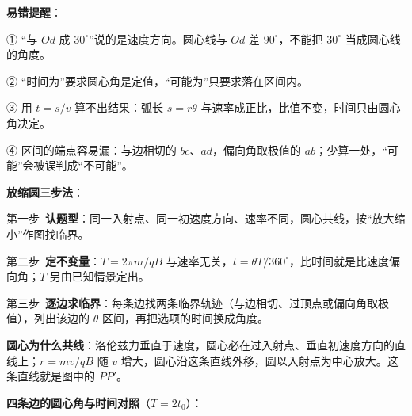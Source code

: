 \documentclass[\modimode]{modi-handout}
\begin{document}
\vspace*{10pt}
\begin{modistem}
\textbf{易错提醒}：

\par ① “与 $Od$ 成 $30^\circ$”说的是速度方向。圆心线与 $Od$ 差 $90^\circ$，不能把 $30^\circ$ 当成圆心线的角度。

\par ② “时间为”要求圆心角是定值，“可能为”只要求落在区间内。

\par ③ 用 $t=s/v$ 算不出结果：弧长 $s=r\theta$ 与速率成正比，比值不变，时间只由圆心角决定。

\par ④ 区间的端点容易漏：与边相切的 $bc$、$ad$，偏向角取极值的 $ab$；少算一处，“可能”会被误判成“不可能”。
\end{modistem}

\newpage
\vspace*{-22pt}


\begin{modistem}
\textbf{放缩圆三步法}：

\par 第一步\ \textbf{认题型}：同一入射点、同一初速度方向、速率不同，圆心共线，按“放大缩小”作图找临界。

\par 第二步\ \textbf{定不变量}：$T=2\pi m/qB$ 与速率无关，$t=\theta T/360^\circ$，比时间就是比速度偏向角；$T$ 另由已知情景定出。

\par 第三步\ \textbf{逐边求临界}：每条边找两条临界轨迹（与边相切、过顶点或偏向角取极值），列出该边的 $\theta$ 区间，再把选项的时间换成角度。
\end{modistem}

\begin{modistem}
\textbf{圆心为什么共线}：洛伦兹力垂直于速度，圆心必在过入射点、垂直初速度方向的直线上；$r=mv/qB$ 随 $v$ 增大，圆心沿这条直线外移，圆以入射点为中心放大。这条直线就是图中的 $PP'$。
\end{modistem}


\begin{modistem}
\textbf{四条边的圆心角与时间对照}（$T=2t_0$）：
\end{modistem}
\end{document}
